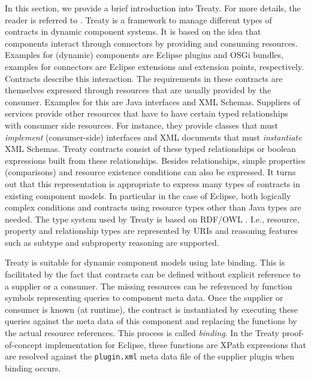 \documentclass{llncs}
\begin{document}
In this section, we provide a brief introduction into Treaty. For more details, the reader is referred to \cite{Treaty.JOT2009}. Treaty is a framework to manage different types of contracts in dynamic component systems. It is based on the idea 
that components interact through connectors by providing and consuming resources. Examples for (dynamic) components are Eclipse plugins and OSGi bundles, examples for connectors are Eclipse extensions and extension points, respectively. Contracts describe this interaction. The requirements in these contracts are themselves expressed through resources that are usually provided by the consumer. Examples for this
are Java interfaces and XML Schemas. Suppliers of services provide other resources that have to have certain typed relationships with consumer side resources. For instance, they provide classes that must \textit{implement} (consumer-side) 
interfaces and XML documents that must \textit{instantiate} XML Schemas. Treaty contracts consist of these typed relationships or boolean expressions built from these relationships. Besides relationships, simple properties (comparisons) and 
resource existence conditions can also be expressed. It turns out that this representation is appropriate to express many types of contracts in existing component models. In particular in the case of Eclipse,  both logically complex conditions and contracts using resource types other than Java types are needed. The type system used by Treaty is based on RDF/OWL \cite{RDF,OWL}. I.e., resource, property and relationship types are represented by URIs and reasoning features such as subtype and subproperty reasoning are supported. 

Treaty is suitable for dynamic component models using late binding. This is facilitated by the fact that contracts can be defined without explicit reference to a supplier or a consumer. The missing resources can be referenced by function symbols representing queries to component meta data. Once the supplier or consumer is known (at runtime), the contract is instantiated by executing these queries against the meta data of this component and replacing the functions by the actual resource references. This process is called \textit{binding}. In the Treaty proof-of-concept implementation for Eclipse, these functions are XPath expressions that are resolved against the \texttt{plugin.xml} meta data file of the supplier plugin when binding occurs. 
\end{document}
